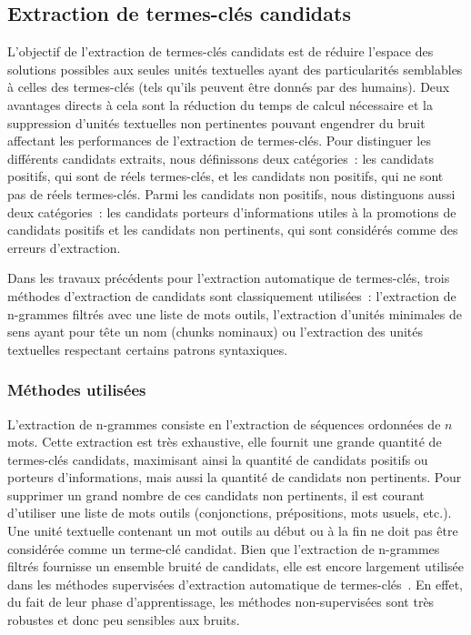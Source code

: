   \subsection{Extraction de termes-clés candidats}
  \label{subsec:extraction_de_termes_cles_candidats}
    L'objectif de l'extraction de termes-clés candidats est de réduire l'espace
    des solutions possibles aux seules unités textuelles ayant des
    particularités semblables à celles des termes-clés (tels qu'ils peuvent être
    donnés par des humains). Deux avantages directs à cela sont la réduction du
    temps de calcul nécessaire et la suppression d'unités textuelles non
    pertinentes pouvant engendrer du bruit affectant les performances de
    l'extraction de termes-clés. Pour distinguer les différents candidats
    extraits, nous définissons deux catégories~: les candidats positifs, qui
    sont de réels termes-clés, et les candidats non positifs, qui ne sont pas de
    réels termes-clés. Parmi les candidats non positifs, nous distinguons aussi
    deux catégories~: les candidats porteurs d'informations utiles à la
    promotions de candidats positifs et les candidats non pertinents, qui sont
    considérés comme des erreurs d'extraction.

    Dans les travaux précédents pour l'extraction automatique de termes-clés,
    trois méthodes d'extraction de candidats sont classiquement utilisées~:
    l'extraction de n-grammes filtrés avec une liste de mots outils,
    l'extraction d'unités minimales de sens ayant pour tête un nom (chunks
    nominaux) ou l'extraction des unités textuelles respectant certains patrons
    syntaxiques.

    \subsubsection{Méthodes utilisées}
    \label{subsubsec:methodes_explorees}

      L'extraction de n-grammes consiste en l'extraction de séquences ordonnées
      de $n$ mots. Cette extraction est très exhaustive, elle fournit une grande
      quantité de termes-clés candidats, maximisant ainsi la quantité de
      candidats positifs ou porteurs d'informations, mais aussi la quantité de
      candidats non pertinents. Pour supprimer un grand nombre de ces candidats
      non pertinents, il est courant d'utiliser une liste de mots outils
      (conjonctions, prépositions, mots usuels, etc.). Une unité textuelle
      contenant un mot outils au début ou à la fin ne doit pas être considérée
      comme un terme-clé candidat. Bien que l'extraction de n-grammes filtrés
      fournisse un ensemble bruité de candidats, elle est encore largement
      utilisée dans les méthodes supervisées d'extraction automatique de
      termes-clés~\cite{witten1999kea,turney1999learningalgorithms,hulth2003keywordextraction}.
      En effet, du fait de leur phase d'apprentissage, les méthodes
      non-supervisées sont très robustes et donc peu sensibles aux bruits.

